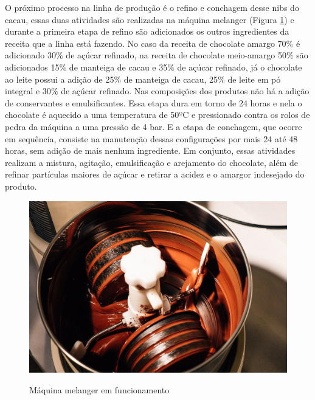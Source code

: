 \documentclass[
	12pt,				%
	openright,			%
	oneside,			%
	a4paper,			%
	english,			%
	french,				%
	spanish,			%
	brazil				%
	]{abntex2}
\begin{document}
O próximo processo na linha de produção é o refino e conchagem desse nibs do cacau, essas duas atividades são realizadas na máquina melanger (Figura \ref{figmelanger}) e durante a primeira etapa de refino são adicionados os outros ingredientes da receita que a linha está fazendo. No caso da receita de chocolate amargo 70$\%$ é adicionado 30$\%$ de açúcar refinado, na receita de chocolate meio-amargo 50$\%$ são adicionados 15$\%$ de manteiga de cacau e 35$\%$ de açúcar refinado, já o chocolate ao leite possui a adição de 25$\%$ de manteiga de cacau, 25$\%$ de leite em pó integral e 30$\%$ de açúcar refinado. Nas composições dos produtos não há a adição de conservantes e emulsificantes. Essa etapa dura em torno de 24 horas e nela o chocolate é aquecido a uma temperatura de 50ºC e pressionado contra os rolos de pedra da máquina a uma pressão de 4 bar. E a etapa de conchagem, que ocorre em sequência, consiste na manutenção dessas configurações por mais 24 até 48 horas, sem adição de mais nenhum ingrediente. Em conjunto, essas atividades realizam a mistura, agitação, emulsificação e arejamento do chocolate, além de refinar partículas maiores de açúcar e retirar a acidez e o amargor indesejado do produto. \cite{lindt} 

\begin{figure}[H]
\begin{center}
\caption{Máquina melanger em funcionamento}
\includegraphics[scale=0.35]{../../Pictures/melanger.jpeg} 
\label{figmelanger}
\end{center}
\end{figure}
\end{document}
